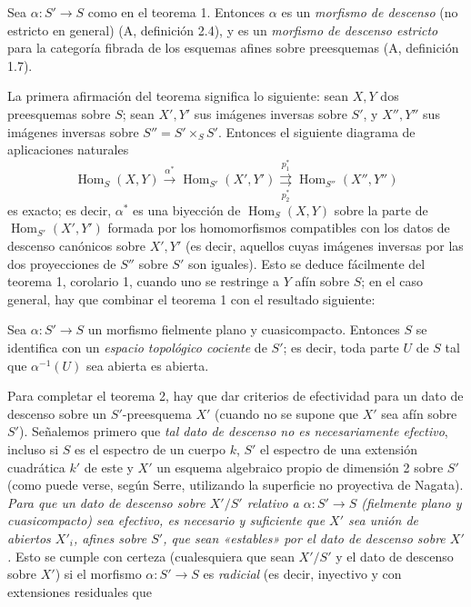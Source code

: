  Sea $\alpha:S'\longrightarrow S$ como en el teorema 1.
Entonces $\alpha$ es un \emph{morfismo de descenso} (no estricto en general)
(A, definición 2.4), y es un \emph{morfismo de descenso estricto} para la
categoría fibrada de los esquemas afines sobre preesquemas
(A, definición 1.7).

La primera afirmación del teorema significa lo siguiente: sean $X,Y$ dos
preesquemas sobre $S$; sean $X',Y'$ sus imágenes inversas sobre $S'$, y
$X'',Y''$ sus imágenes inversas sobre $S''=S'\times_SS'$. Entonces el siguiente
diagrama de aplicaciones naturales
\[
  \operatorname{Hom}_S(X,Y)\xrightarrow{\alpha^*}
  \operatorname{Hom}_{S'}(X',Y')
  \underset{p_2^*}{\overset{p_1^*}{\rightrightarrows}}
  \operatorname{Hom}_{S''}(X'',Y'')
\]
es exacto; es decir, $\alpha^*$ es una biyección de
$\operatorname{Hom}_S(X,Y)$ sobre la parte de
$\operatorname{Hom}_{S'}(X',Y')$ formada por los homomorfismos compatibles con
los datos de descenso canónicos sobre $X',Y'$ (es decir, aquellos cuyas
imágenes inversas por las dos proyecciones de $S''$ sobre $S'$ son iguales).
Esto se deduce fácilmente del teorema 1, corolario 1, cuando uno se restringe
a $Y$ afín sobre $S$; en el caso general, hay que combinar el teorema 1 con el
resultado siguiente:

 Sea $\alpha:S'\longrightarrow S$ un morfismo fielmente plano
y cuasicompacto. Entonces $S$ se identifica con un \emph{espacio topológico
cociente} de $S'$; es decir, toda parte $U$ de $S$ tal que
$\alpha^{-1}(U)$ sea abierta es abierta.

Para completar el teorema 2, hay que dar criterios de efectividad para un dato
de descenso sobre un $S'$-preesquema $X'$ (cuando no se supone que $X'$ sea
afín sobre $S'$). Señalemos primero que \emph{tal dato de descenso no es
necesariamente efectivo}, incluso si $S$ es el espectro de un cuerpo $k$, $S'$
el espectro de una extensión cuadrática $k'$ de este y $X'$ un esquema
algebraico propio de dimensión 2 sobre $S'$ (como puede verse, según Serre,
utilizando la superficie no proyectiva de Nagata). \emph{Para que un dato de
descenso sobre $X'/S'$ relativo a $\alpha:S'\longrightarrow S$ (fielmente
plano y cuasicompacto) sea efectivo, es necesario y suficiente que $X'$ sea
unión de abiertos $X'_i$, afines sobre $S'$, que sean «estables» por el dato de
descenso sobre $X'$.} Esto se cumple con certeza (cualesquiera que sean $X'/S'$
y el dato de descenso sobre $X'$) si el morfismo
$\alpha:S'\longrightarrow S$ es \emph{radicial} (es decir, inyectivo y con
extensiones residuales que

